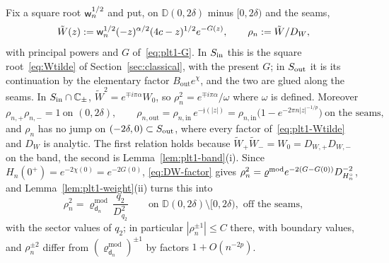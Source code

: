 Fix a square root $\mathsf w_n^{1/2}$ and put, on $\mathbb D(0,2\delta)$ minus $[0,2\delta)$ and the seams,
\begin{equation}\label{eq:plt1-Wtilde}
  \tilde W(z):=\mathsf w_n^{1/2}(-z)^{\alpha/2}(4c-z)^{1/2}e^{-G(z)},\qquad \rho_n:=\tilde W/D_W ,
\end{equation}
with principal powers and $G$ of~\eqref{eq:plt1-G}. In $S_{\mathrm{in}}$ this is the square root~\eqref{eq:Wtilde} of
Section~\ref{sec:classical}, with the present $G$; in $S_{\mathrm{out}}$ it is its continuation by the elementary factor
$B_{\mathrm{out}}e^\chi$, and the two are glued along the seams. In $S_{\mathrm{in}}\cap\mathbb{C}_\pm$, $\tilde W^2=e^{\mp i\pi\alpha}W_0$,
so $\rho_n^2=e^{\mp i\pi\alpha}/\omega$ where $\omega$ is defined. Moreover
\begin{equation}\label{eq:plt1-rho-props}
  \rho_{n,+}\rho_{n,-}=1\ \text{on }(0,2\delta),\qquad
  \rho_{n,\mathrm{out}}=\rho_{n,\mathrm{in}}\,e^{-\mathfrak j(|z|)}=\rho_{n,\mathrm{in}}\bigl(1-e^{-2\pi n|z|^{-1/p}}\bigr)\ \text{on the seams},
\end{equation}
and $\rho_n$ has no jump on $(-2\delta,0)\subset S_{\mathrm{out}}$, where every factor of~\eqref{eq:plt1-Wtilde} and $D_W$ is
analytic. The first relation holds because $\tilde W_+\tilde W_-=W_0=D_{W,+}D_{W,-}$ on the band, the second is
Lemma~\ref{lem:plt1-band}(i). Since $H_n(0^+)=e^{-2\chi(0)}=e^{-2G(0)}$, \eqref{eq:DW-factor} gives
$\rho_n^2=\varrho^{\mathrm{mod}}e^{-2(G-G(0))}D_{H^{\circ}_n}^{-2}$, and Lemma~\ref{lem:plt1-weight}(ii) turns this into
\begin{equation}\label{eq:plt1-rho-mod}
  \rho_n^2=\varrho^{\mathrm{mod}}_{\mathsf d_n}\,\frac{q_2}{D_{q_2}^2}\qquad\text{on }\mathbb D(0,2\delta)\setminus[0,2\delta),
  \text{ off the seams},
\end{equation}
with the sector values of $q_2$; in particular $|\rho_n^{\pm1}|\le C$ there, with boundary values, and $\rho_n^{\pm2}$
differ from $(\varrho^{\mathrm{mod}}_{\mathsf d_n})^{\pm1}$ by factors $1+O(n^{-2p})$.


